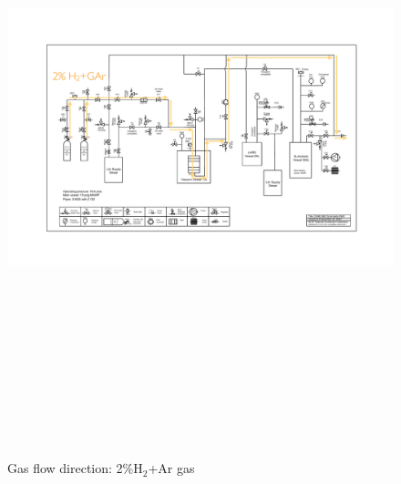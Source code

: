 \documentclass[letterpaper,11pt]{article}
\newcommand{\Hydro}     {H$_2$}
\begin{document}
\begin{figure}[htb]
\begin{center}
\includegraphics[angle=90,origin=c,height=7.3in]{fig/RegenerationH2_PIDv8.4.pdf}
\caption{Gas flow direction: 2\%{\Hydro}+Ar gas}
\label{fig:H2Flow}
\end{center}
\end{figure}
\end{document}
